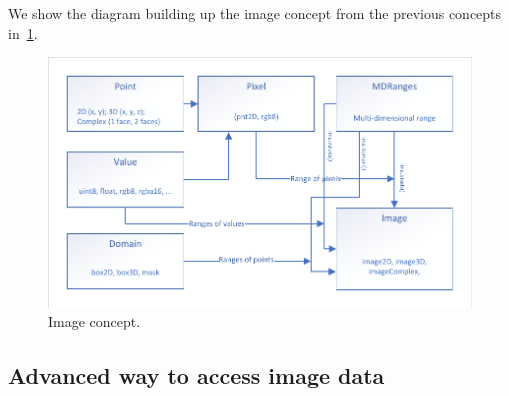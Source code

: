 We show the diagram building up the image concept from the previous concepts in~\cref{fig:concept.image}.

\begin{figure}[htbp]
  \centering
  \includegraphics[width=.8\linewidth]{../figures/concepts/image}
  \caption{Image concept.}
  \label{fig:concept.image}
\end{figure}


\subsection{Advanced way to access image data}
\label{subsec:advanced}

